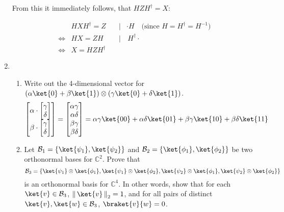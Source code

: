 \documentclass{article}
\newcommand{\norm}[1]{\left\|\,#1\,\right\|}       %
\newcommand{\enorm}[1]{\norm{#1}_{\mathrm{2}}}      %
\newcommand{\set}[1]{{\left\{#1\right\}}}    %
\newcommand{\complex}{{\mathbb C}}
\begin{document}
\begin{enumerate}
        From this it immediately follows, that $HZH^\dagger=X$:

        $$\begin{aligned}
                 & HXH^\dagger = Z \quad & | & \cdot H \quad\text{(since $H=H^\dagger=H^{-1}$)} \\
            \iff & HX = ZH \quad         & | & \, H^\dagger\cdot                                \\
            \iff & X=HZH^\dagger
          \end{aligned}$$
  \item %
        \begin{enumerate}
          \item %
                Write out the 4-dimensional vector for $(\alpha\ket{0}+\beta\ket{1})\otimes(\gamma\ket{0}+\delta\ket{1})$.
                $$\begin{bmatrix}
                    \alpha\cdot\begin{bmatrix}
                                 \gamma \\
                                 \delta \\
                               \end{bmatrix} \\
                    \beta\cdot\begin{bmatrix}
                                \gamma \\
                                \delta \\
                              \end{bmatrix}  \\
                  \end{bmatrix}=\begin{bmatrix}
                    \alpha\gamma \\
                    \alpha\delta \\
                    \beta\gamma  \\
                    \beta\delta  \\
                  \end{bmatrix}=\alpha\gamma\ket{00}+\alpha\delta\ket{01}+\beta\gamma\ket{10}+\beta\delta\ket{11}$$
          \item %
                Let $\mathcal{B}_1=\set{\ket{\psi_1},\ket{\psi_2}}$ and $\mathcal{B}_2=\set{\ket{\phi_1},\ket{\phi_2}}$ be two orthonormal bases for $\complex^2$. Prove that
                \[
                  \mathcal{B}_3 = \set{\ket{\psi_1}\otimes\ket{\phi_1},\ket{\psi_1}\otimes\ket{\phi_2},\ket{\psi_2}\otimes\ket{\phi_1},\ket{\psi_2}\otimes\ket{\phi_2}}
                \]
                is an orthonormal basis for $\complex^4$. In other words, show that for each $\ket{v}\in\mathcal{B}_3$, $\enorm{\ket{v}}=1$, and for all pairs of distinct $\ket{v},\ket{w}\in\mathcal{B}_3$, $\braket{v}{w}=0$.
                \vspace{0.5cm}


\end{enumerate}
\end{enumerate}
\end{document}
